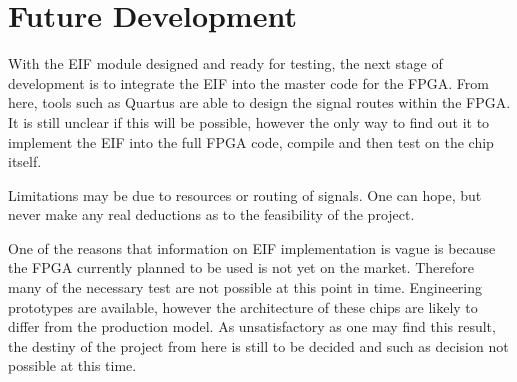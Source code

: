 \section{Future Development}

	With the EIF module designed and ready for testing, the next stage of development is to integrate the EIF into the master code for the FPGA.
	From here, tools such as Quartus are able to design the signal routes within the FPGA.
	It is still unclear if this will be possible, however the only way to find out it to implement the EIF into the full FPGA code, compile and then test on the chip itself.

	Limitations may be due to resources or routing of signals.
	One can hope, but never make any real deductions as to the feasibility of the project.

	One of the reasons that information on EIF implementation is vague is because the FPGA currently planned to be used is not yet on the market.
	Therefore many of the necessary test are not possible at this point in time.
	Engineering prototypes are available, however the architecture of these chips are likely to differ from the production model.
	As unsatisfactory as one may find this result, the destiny of the project from here is still to be decided and such as decision not possible at this time. 